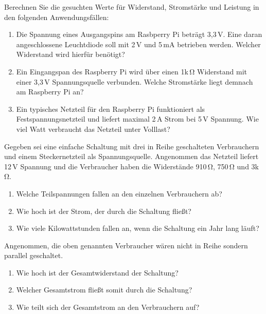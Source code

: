 \bigskip
\teilaufgabe
Berechnen Sie die gesuchten Werte für Widerstand, Stromstärke und Leistung in den
folgenden Anwendungsfällen:

\begin{enumerate}
    \item Die Spannung eines Ausgangspins am Rasbperry Pi beträgt 3,3\,V. Eine
    daran angeschlossene Leuchtdiode soll mit 2\,V und 5\,mA betrieben werden.
    Welcher Widerstand wird hierfür benötigt?

    \item Ein Eingangspan des Raspberry Pi wird über einen 1k\,\si{\ohm} Widerstand
    mit einer 3,3\,V Spannungsquelle verbunden. Welche Stromstärke liegt demnach
    am Raspberry Pi an?

    \item Ein typisches Netzteil für den Raspberry Pi funktioniert als
    Festspannungsnetzteil und liefert maximal 2\,A Strom bei 5\,V Spannung.
    Wie viel Watt verbraucht das Netzteil unter Volllast?
\end{enumerate}

\teilaufgabe
Gegeben sei eine einfache Schaltung mit drei in Reihe geschalteten Verbrauchern
und einem Steckernetzteil als Spannungsquelle. Angenommen das Netzteil liefert
12\,V Spannung und die Verbraucher haben die Widerstände 910\,\si{\ohm}, 750\,\si{\ohm}
und 3k\,\si{\ohm}.

\begin{enumerate}
    \item Welche Teilspannungen fallen an den einzelnen Verbrauchern ab?
    \item Wie hoch ist der Strom, der durch die Schaltung fließt?
    \item Wie viele Kilowattstunden fallen an, wenn die Schaltung ein Jahr lang läuft?
\end{enumerate}

\teilaufgabe
Angenommen, die oben genannten Verbraucher wären nicht in Reihe sondern parallel
geschaltet.

\begin{enumerate}
    \item Wie hoch ist der Gesamtwiderstand der Schaltung?
    \item Welcher Gesamtstrom fließt somit durch die Schaltung?
    \item Wie teilt sich der Gesamtstrom an den Verbrauchern auf?
\end{enumerate}

